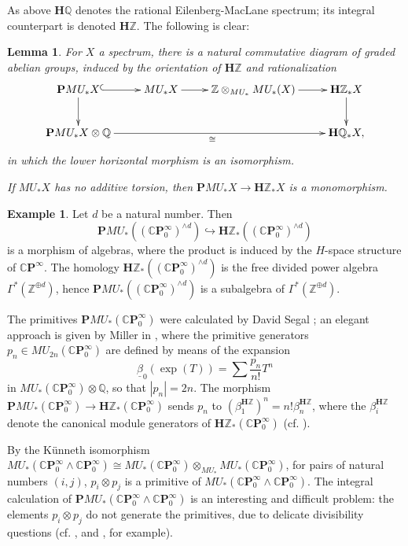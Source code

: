 \documentclass[10pt,a4paper]{amsart}
\newtheorem{lem}[thm]{Lemma}
\theoremstyle{definition}
\newtheorem{exam}[thm]{Example}
\theoremstyle{remark}
\newcommand{\prim}{\mathbf{P}}
\newcommand{\zed}{\mathbb{Z}}
\newcommand{\rat}{\mathbb{Q}}
\newcommand{\hq}{\mathbf{H}\mathbb{Q}}
\newcommand{\hz}{{\mathbf{H}\mathbb{Z}}}
\newcommand{\cp}{\mathbb{C} \mathbf{P}^\infty}
\renewcommand{\smash}{\wedge}
\begin{document}
As above $\hq$ denotes the rational Eilenberg-MacLane spectrum; its integral counterpart is denoted $\hz$. The following is clear:

\begin{lem}
\label{lem:thom_orientation_primitives}
	For $X$  a spectrum, there is a natural commutative diagram of graded abelian groups, induced by the orientation of $\hz$ and rationalization
\[
	\xymatrix{
\prim MU_* X
\ar@{^(->}[r]
\ar[d]
&
MU_* X
\ar[r]
&
\zed \otimes_{MU_* } MU_* (X)
\ar[r]
&
\hz_* X
\ar[d]
\\
\prim MU_* X \otimes \rat
\ar[rrr]_\cong
&&&
\hq_* X,
}
\]
in which the lower horizontal morphism is an isomorphism.

If $MU_* X$ has no additive torsion, then
$\prim MU_* X \rightarrow \hz_* X$ is a monomorphism.
\end{lem}



\begin{exam}
\label{exam:prim_CP}
	Let  $d$  be a natural number. Then
$$
	\prim
MU_* ((\cp_0)^{\smash d})
\hookrightarrow
\hz_* ((\cp_0)^{\smash d})
$$
is a morphism of algebras, where the product is induced by the $H$-space structure of $\cp$. The homology $\hz_*
((\cp_0)^{\smash d})$ is the free divided power algebra $\Gamma^* (\zed^{\oplus d}) $, hence $ \prim MU_* ((\cp_0)^{\smash d})$ is a subalgebra of $\Gamma^* (\zed^{\oplus d}) $.
\end{exam}




	The primitives $ \prim MU_* (\cp_0)$ were calculated by David Segal
\cite{segal}; an elegant approach is given by Miller in \cite[Proposition 4.1]{miller}, where
the primitive generators $p_n \in MU_{2n}(\cp_0)$ are defined by means of the expansion
\[
	\underline{\beta}_0(\exp (T))
=
\sum
\frac{p_n}{n!}T^n
\]
in $MU_* (\cp_0) \otimes \rat$, so that $|p_n|= 2n$.  The morphism
$
\prim MU_* (\cp_0) \rightarrow \hz_* (\cp_0)
$
sends $p_n$ to $ (\beta_1^\hz)^n  = n! \beta_n^\hz$, where  the $\beta_i^\hz$ denote the canonical module generators of $\hz_* (\cp_0)$ (cf. \cite[Remark 4.2]{miller}).


By the Künneth isomorphism $MU_* (\cp_0 \smash \cp_0) \cong MU_* (\cp_0) \otimes_{MU_*} MU_*(\cp_0)$, for pairs of natural numbers $(i,j)$, $p_i \otimes p_j$ is a primitive of $MU_* (\cp_0 \smash \cp_0)$.  The integral calculation of $\prim MU_* (\cp_0 \smash \cp_0)$   is an interesting and difficult problem: the elements $p_i \otimes p_j$ do not generate the primitives, due to delicate divisibility questions (cf. \cite{knapp_habilit}, \cite{baker_transfer} and \cite{BCRS}, for example).
\end{document}
